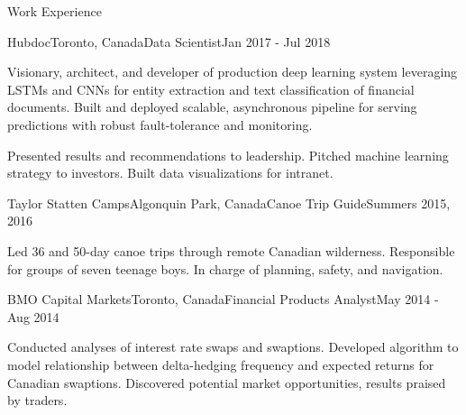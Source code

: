 \documentclass{resume} %
\begin{document}
\begin{rSection}{Work Experience}
\begin{rSubsection}{Hubdoc}{Toronto, Canada}{Data Scientist}{Jan 2017 - Jul 2018}
\item
    Visionary, architect, and developer of production deep learning system leveraging LSTMs and CNNs
    for entity extraction and text classification of financial documents.
    Built and deployed scalable, asynchronous pipeline for serving predictions with robust fault-tolerance and monitoring.

\item
    Presented results and recommendations to leadership.
    Pitched machine learning strategy to investors.
    Built data visualizations for intranet.

\end{rSubsection}


\begin{rSubsection}{Taylor Statten Camps}{Algonquin Park, Canada}{Canoe Trip Guide}{Summers 2015, 2016}

\item
    Led 36 and 50-day canoe trips through remote Canadian wilderness. Responsible for groups of seven teenage boys. In charge of planning,
    safety, and navigation.

\end{rSubsection}


\begin{rSubsection}{BMO Capital Markets}{Toronto, Canada}{Financial Products Analyst}{May 2014 - Aug 2014}

\item
    Conducted analyses of interest rate swaps and swaptions.
    Developed algorithm to model relationship between delta-hedging frequency and expected returns for Canadian swaptions.
    Discovered potential market opportunities, results praised by traders.

\end{rSubsection}


\end{rSection}

\end{document}
